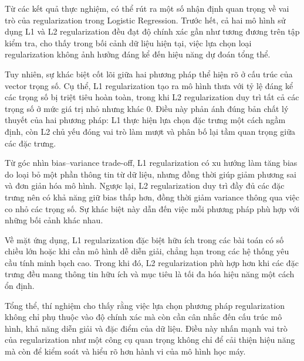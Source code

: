 Từ các kết quả thực nghiệm, có thể rút ra một số nhận định quan trọng về vai trò của regularization trong Logistic Regression. Trước hết, cả hai mô hình sử dụng L1 và L2 regularization đều đạt độ chính xác gần như tương đương trên tập kiểm tra, cho thấy trong bối cảnh dữ liệu hiện tại, việc lựa chọn loại regularization không ảnh hưởng đáng kể đến hiệu năng dự đoán tổng thể.

Tuy nhiên, sự khác biệt cốt lõi giữa hai phương pháp thể hiện rõ ở cấu trúc của vector trọng số. Cụ thể, L1 regularization tạo ra mô hình thưa với tỷ lệ đáng kể các trọng số bị triệt tiêu hoàn toàn, trong khi L2 regularization duy trì tất cả các trọng số ở mức giá trị nhỏ nhưng khác 0. Điều này phản ánh đúng bản chất lý thuyết của hai phương pháp: L1 thực hiện lựa chọn đặc trưng một cách ngầm định, còn L2 chủ yếu đóng vai trò làm mượt và phân bố lại tầm quan trọng giữa các đặc trưng.

Từ góc nhìn bias–variance trade-off, L1 regularization có xu hướng làm tăng bias do loại bỏ một phần thông tin từ dữ liệu, nhưng đồng thời giúp giảm phương sai và đơn giản hóa mô hình. Ngược lại, L2 regularization duy trì đầy đủ các đặc trưng nên có khả năng giữ bias thấp hơn, đồng thời giảm variance thông qua việc co nhỏ các trọng số. Sự khác biệt này dẫn đến việc mỗi phương pháp phù hợp với những bối cảnh khác nhau.

Về mặt ứng dụng, L1 regularization đặc biệt hữu ích trong các bài toán có số chiều lớn hoặc khi cần mô hình dễ diễn giải, chẳng hạn trong các hệ thống yêu cầu tính minh bạch cao. Trong khi đó, L2 regularization phù hợp hơn khi các đặc trưng đều mang thông tin hữu ích và mục tiêu là tối đa hóa hiệu năng một cách ổn định.

Tổng thể, thí nghiệm cho thấy rằng việc lựa chọn phương pháp regularization không chỉ phụ thuộc vào độ chính xác mà còn cần cân nhắc đến cấu trúc mô hình, khả năng diễn giải và đặc điểm của dữ liệu. Điều này nhấn mạnh vai trò của regularization như một công cụ quan trọng không chỉ để cải thiện hiệu năng mà còn để kiểm soát và hiểu rõ hơn hành vi của mô hình học máy.